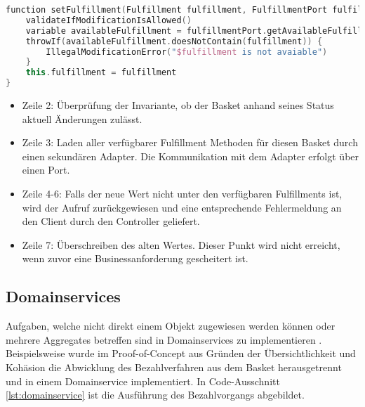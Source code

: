 \begin{minipage}{\linewidth} %
	\begin{lstlisting}[caption={Setzen der Fulfillment Methode im Basket Aggregate}, label={lst:basket}, language=Kotlin]
function setFulfillment(Fulfillment fulfillment, FulfillmentPort fulfillmentPort) {
	validateIfModificationIsAllowed()
	variable availableFulfillment = fulfillmentPort.getAvailableFulfillment(outletID)
	throwIf(availableFulfillment.doesNotContain(fulfillment)) {
		IllegalModificationError("$fulfillment is not avaiable")
	}
	this.fulfillment = fulfillment
}
	\end{lstlisting}


	\begin{itemize}[noitemsep,nolistsep]
		\item Zeile 2: Überprüfung der Invariante, ob der Basket anhand seines Status aktuell Änderungen zulässt.
		\item Zeile 3: Laden aller verfügbarer Fulfillment Methoden für diesen Basket durch einen sekundären Adapter. Die Kommunikation mit dem Adapter erfolgt über einen Port.
		\item Zeile 4-6: Falls der neue Wert nicht unter den verfügbaren Fulfillments ist, wird der Aufruf zurückgewiesen und eine entsprechende Fehlermeldung an den Client durch den Controller geliefert.
		\item Zeile 7: Überschreiben des alten Wertes. Dieser Punkt wird nicht erreicht, wenn zuvor eine Businessanforderung gescheitert ist.
	\end{itemize}
\end{minipage}

\subsection{Domainservices}

Aufgaben, welche nicht direkt einem Objekt zugewiesen werden können oder mehrere Aggregates betreffen sind in Domainservices zu implementieren \cite[S. 267]{Vernon.2015}. Beispielsweise wurde im Proof-of-Concept aus Gründen der Übersichtlichkeit und Kohäsion die Abwicklung des Bezahlverfahren aus dem Basket herausgetrennt und in einem Domainservice implementiert. In Code-Ausschnitt \ref{lst:domainservice} ist die Ausführung des Bezahlvorgangs abgebildet. 

